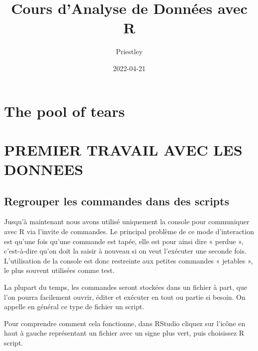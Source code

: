 \documentclass[
]{book}
\title{Cours d'Analyse de Données avec R}
\author{Priestley}
\date{2022-04-21}
\begin{document}
\maketitle

{
\setcounter{tocdepth}{1}
\tableofcontents
}
\hypertarget{the-pool-of-tears}{%
\chapter{The pool of tears}\label{the-pool-of-tears}}

\hypertarget{premier-travail-avec-les-donnees}{%
\chapter{PREMIER TRAVAIL AVEC LES DONNEES}\label{premier-travail-avec-les-donnees}}

\hypertarget{regrouper-les-commandes-dans-des-scripts}{%
\section{Regrouper les commandes dans des scripts}\label{regrouper-les-commandes-dans-des-scripts}}

Jusqu'à maintenant nous avons utilisé uniquement la console pour communiquer avec R via l'invite de commandes. Le principal problème de ce mode d'interaction est qu'une fois qu'une commande est tapée, elle est pour ainsi dire « perdue », c'est-à-dire qu'on doit la saisir à nouveau si on veut l'exécuter une seconde fois. L'utilisation de la console est donc restreinte aux petites commandes « jetables », le plus souvent utilisées comme test.

La plupart du temps, les commandes seront stockées dans un fichier à part, que l'on pourra facilement ouvrir, éditer et exécuter en tout ou partie si besoin. On appelle en général ce type de fichier un script.

Pour comprendre comment cela fonctionne, dans RStudio cliquez sur l'icône en haut à gauche représentant un fichier avec un signe plus vert, puis choisissez R script.
\end{document}
